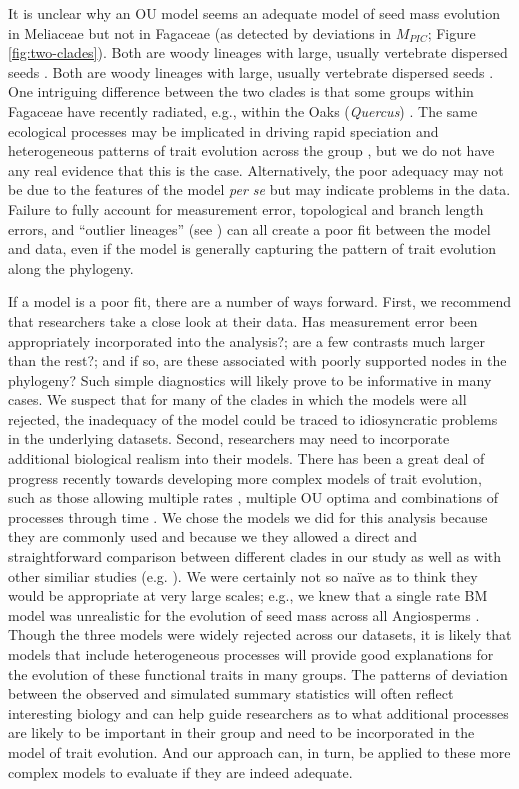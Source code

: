 \documentclass[a4paper,12pt]{article}
\begin{document}
It is unclear why an OU model seems an adequate model of seed mass evolution in Meliaceae but not in Fagaceae (as detected by deviations in $M_{PIC}$; Figure \ref{fig:two-clades}).  Both are woody lineages with large, usually vertebrate dispersed seeds \citep{Pannell1987, Manos2001}.
Both are woody lineages with large, usually vertebrate dispersed seeds \citep{Pannell1987, Manos2001}. One intriguing difference between the two clades is that some groups within Fagaceae have recently radiated, e.g., within the Oaks (\emph{Quercus}) \citep{Simeone2013}. The same ecological processes may be implicated in driving rapid speciation and heterogeneous patterns of trait evolution across the group \citep{Schluter2000}, but we do not have any real evidence that this is the case. Alternatively, the poor adequacy may not be due to the features of the model \emph{per se} but may indicate problems in the data. Failure to fully account for measurement error, topological and branch length errors, and ``outlier lineages'' (see \citep{SlaterPennell}) can all create a poor fit between the model and data, even if the model is generally capturing the pattern of trait evolution along the phylogeny.

If a model is a poor fit, there are a number of ways forward. First, we recommend that researchers take a close look at their data. Has measurement error been appropriately incorporated into the analysis?; are a few contrasts much larger than the rest?; and if so, are these associated with poorly supported nodes in the phylogeny? Such simple diagnostics will likely prove to be informative in many cases. We suspect that for many of the clades in which the models were all rejected, the inadequacy of the model could be traced to idiosyncratic problems in the underlying datasets. Second, researchers may need to incorporate additional biological realism into their models. There has been a great deal of progress recently towards developing more complex models of trait evolution, such as those allowing multiple rates \citep{Omeara2006, Eastman2011}, multiple OU optima \citep{ButlerKing2004, Beaulieu2012, UyedaBayou} and combinations of processes through time \citep{SlaterMEE}. We chose the models we did for this analysis because they are commonly used and because we they allowed a direct and straightforward comparison between different clades in our study as well as with other similiar studies (e.g. \citep{Harmon2010}). We were certainly not so na\"{i}ve as to think they would be appropriate at very large scales; e.g., we knew that a single rate BM model was unrealistic for the evolution of seed mass across all Angiosperms \citep{Moles2005}. Though the three  models were widely rejected across our datasets, it is likely that models that include heterogeneous processes will provide good explanations for the evolution of these functional traits in many groups.  The patterns of deviation between the observed and simulated summary statistics will often reflect interesting biology and can help guide researchers as to what additional processes are likely to be important in their group and need to be incorporated in the model of trait evolution. And our approach can, in turn, be applied to these more complex models to evaluate if they are indeed adequate. 
\end{document}
